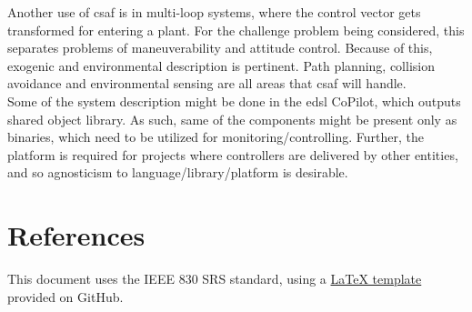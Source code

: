 Another use of \acrshort{csaf} is in multi-loop systems, where the control vector gets transformed for entering a plant. For the challenge problem being considered, this separates problems of maneuverability and attitude control. Because of this, exogenic and environmental description is pertinent. Path planning, collision avoidance and environmental sensing are all areas that \acrshort{csaf} will handle.\\

Some of the system description might be done in the \acrshort{edsl} CoPilot, which outputs shared object library. As such, same of the components might be present only as binaries, which need to be utilized for monitoring/controlling. Further, the platform is required for projects where controllers are delivered by other entities, and so agnosticism to language/library/platform is desirable. 

\section{References}

This document uses the IEEE 830 SRS standard, using a \href{https://github.com/jpeisenbarth/SRS-Tex}{\LaTeX{} template} provided on GitHub.  \\
